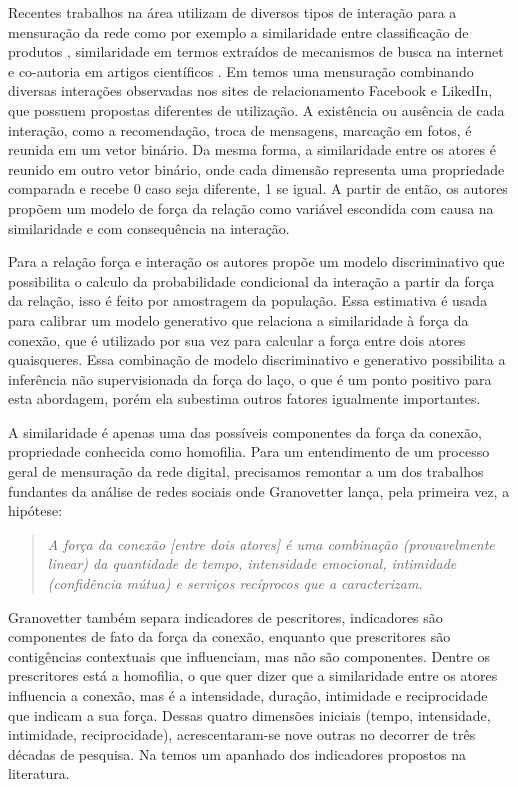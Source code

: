 Recentes trabalhos na área utilizam de diversos tipos de interação para a
mensuração da rede como por exemplo a similaridade entre classificação de
produtos \citep{Richardson2002}, similaridade em termos extraídos de mecanismos
de busca na internet \citep{MATSUO2007} e co-autoria em artigos científicos
\citep{Kempe2003}. Em \citet{Xiang2010} temos uma mensuração combinando diversas
interações observadas nos sites de relacionamento Facebook e LikedIn, que
possuem propostas diferentes de utilização. A existência ou ausência de cada
interação, como a recomendação, troca de mensagens, marcação em fotos, é reunida
em um vetor binário. Da mesma forma, a similaridade entre os atores é reunido em
outro vetor binário, onde cada dimensão representa uma propriedade comparada e
recebe 0 caso seja diferente, 1 se igual. A partir de então, os autores propõem
um modelo de força da relação como variável escondida com causa na similaridade
e com consequência na interação. 

Para a relação força e interação os autores propõe um modelo discriminativo que
possibilita o calculo da probabilidade condicional da interação a partir da
força da relação, isso é feito por amostragem da população. Essa estimativa é
usada para calibrar um modelo generativo que relaciona a similaridade à força da
conexão, que é utilizado por sua vez para calcular a força entre dois atores
quaisqueres. Essa combinação de modelo discriminativo e generativo possibilita a
inferência não supervisionada da força do laço, o que é um ponto positivo para
esta abordagem, porém ela subestima outros fatores igualmente importantes.

A similaridade é apenas uma das possíveis componentes da força da conexão,
propriedade conhecida como homofilia. Para um entendimento de um processo geral
de mensuração da rede digital, precisamos remontar a um dos trabalhos fundantes
da análise de redes sociais onde Granovetter lança, pela primeira vez, a
hipótese:

	\begin{quote}{\citep{Granovetter1973}}
	\emph{A força da conexão [entre dois atores] é uma combinação
	(provavelmente linear) da quantidade de tempo, intensidade emocional,
	intimidade (confidência mútua) e serviços recíprocos que a
	caracterizam.} 
	\end{quote}

Granovetter também separa indicadores de pescritores, indicadores são
componentes de fato da força da conexão, enquanto que prescritores são
contigências contextuais que influenciam, mas não são componentes. Dentre os
prescritores está a homofilia, o que quer dizer que a similaridade entre os
atores influencia a conexão, mas é a intensidade, duração, intimidade e
reciprocidade que indicam a sua força. Dessas quatro dimensões iniciais
(tempo, intensidade, intimidade, reciprocidade), acrescentaram-se nove outras no
decorrer de três décadas de pesquisa. Na  temos um
apanhado dos indicadores propostos na literatura. 

